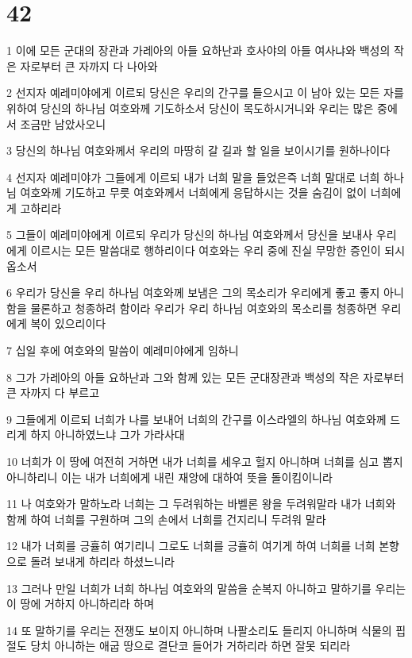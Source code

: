 \chapter{42}

\par 1 이에 모든 군대의 장관과 가레아의 아들 요하난과 호사야의 아들 여사냐와 백성의 작은 자로부터 큰 자까지 다 나아와
\par 2 선지자 예레미야에게 이르되 당신은 우리의 간구를 들으시고 이 남아 있는 모든 자를 위하여 당신의 하나님 여호와께 기도하소서 당신이 목도하시거니와 우리는 많은 중에서 조금만 남았사오니
\par 3 당신의 하나님 여호와께서 우리의 마땅히 갈 길과 할 일을 보이시기를 원하나이다
\par 4 선지자 예레미야가 그들에게 이르되 내가 너희 말을 들었은즉 너희 말대로 너희 하나님 여호와께 기도하고 무릇 여호와께서 너희에게 응답하시는 것을 숨김이 없이 너희에게 고하리라
\par 5 그들이 예레미야에게 이르되 우리가 당신의 하나님 여호와께서 당신을 보내사 우리에게 이르시는 모든 말씀대로 행하리이다 여호와는 우리 중에 진실 무망한 증인이 되시옵소서
\par 6 우리가 당신을 우리 하나님 여호와께 보냄은 그의 목소리가 우리에게 좋고 좋지 아니함을 물론하고 청종하려 함이라 우리가 우리 하나님 여호와의 목소리를 청종하면 우리에게 복이 있으리이다
\par 7 십일 후에 여호와의 말씀이 예레미야에게 임하니
\par 8 그가 가레아의 아들 요하난과 그와 함께 있는 모든 군대장관과 백성의 작은 자로부터 큰 자까지 다 부르고
\par 9 그들에게 이르되 너희가 나를 보내어 너희의 간구를 이스라엘의 하나님 여호와께 드리게 하지 아니하였느냐 그가 가라사대
\par 10 너희가 이 땅에 여전히 거하면 내가 너희를 세우고 헐지 아니하며 너희를 심고 뽑지 아니하리니 이는 내가 너희에게 내린 재앙에 대하여 뜻을 돌이킴이니라
\par 11 나 여호와가 말하노라 너희는 그 두려워하는 바벨론 왕을 두려워말라 내가 너희와 함께 하여 너희를 구원하며 그의 손에서 너희를 건지리니 두려워 말라
\par 12 내가 너희를 긍휼히 여기리니 그로도 너희를 긍휼히 여기게 하여 너희를 너희 본향으로 돌려 보내게 하리라 하셨느니라
\par 13 그러나 만일 너희가 너희 하나님 여호와의 말씀을 순복지 아니하고 말하기를 우리는 이 땅에 거하지 아니하리라 하며
\par 14 또 말하기를 우리는 전쟁도 보이지 아니하며 나팔소리도 들리지 아니하며 식물의 핍절도 당치 아니하는 애굽 땅으로 결단코 들어가 거하리라 하면 잘못 되리라
